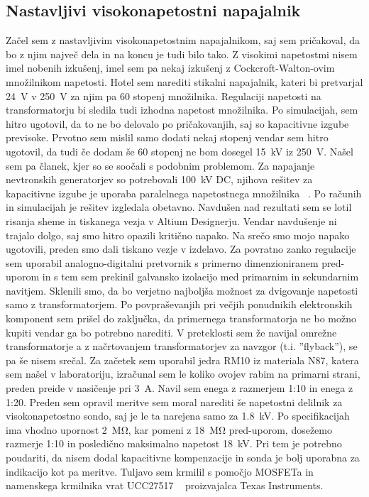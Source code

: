 \documentclass[a4paper,twoside,openright,12pt,Slovene]{book}
\begin{document}
	\subsection{Nastavljivi visokonapetostni napajalnik}
	Začel sem z nastavljivim visokonapetostnim napajalnikom, saj sem pričakoval, da bo z njim največ dela in na koncu je tudi bilo tako. Z visokimi napetostmi nisem imel nobenih izkušenj, imel sem pa nekaj izkušenj z Cockcroft-Walton-ovim množilnikom napetosti. Hotel sem narediti stikalni napajalnik, kateri bi pretvarjal \SI{24}{\volt} v \SI{250}{\volt} za njim pa 60 stopenj množilnika. Regulaciji napetosti na transformatorju bi sledila tudi izhodna napetost množilnika. Po simulacijah, sem hitro ugotovil, da to ne bo delovalo po pričakovanjih, saj so kapacitivne izgube previsoke. Prvotno sem mislil samo dodati nekaj stopenj vendar sem hitro ugotovil, da tudi če dodam še 60 stopenj ne bom dosegel \SI{15}{\kilo\volt} iz \SI{250}{\volt}. Našel sem pa članek, kjer so se soočali s podobnim problemom. Za napajanje nevtronskih generatorjev so potrebovali \SI{100}{\kilo\volt} DC, njihova rešitev za kapacitivne izgube je uporaba paralelnega napetostnega množilnika  ~\cite{ParallelHighVoltageMultipliers}. Po računih in simulacijah je rešitev izgledala obetavno. Navdušen nad rezultati sem se lotil risanja sheme in tiskanega vezja v Altium Designerju. Vendar navdušenje ni trajalo dolgo, saj smo hitro opazili kritično napako. Na srečo smo mojo napako ugotovili, preden smo dali tiskano vezje v izdelavo. Za povratno zanko regulacije sem uporabil analogno-digitalni pretvornik s primerno dimenzioniranem pred-uporom in s tem sem prekinil galvansko izolacijo med primarnim in sekundarnim navitjem. Sklenili smo, da bo verjetno najboljša možnost za dvigovanje napetosti samo z transformatorjem. Po povpraševanjih pri večjih ponudnikih elektronskih komponent sem prišel do zaključka, da primernega transformatorja ne bo možno kupiti vendar ga bo potrebno narediti. V preteklosti sem že navijal omrežne transformatorje a z načrtovanjem transformatorjev za navzgor (t.i. ''flyback''), se pa še nisem srečal. Za začetek sem uporabil jedra RM10 iz materiala N87, katera sem našel v laboratoriju, izračunal sem le koliko ovojev rabim na primarni strani, preden preide v nasičenje pri \SI{3}{\ampere}. Navil sem enega z razmerjem 1:10 in enega z 1:20.
Preden sem opravil meritve sem moral narediti še napetostni delilnik za visokonapetostno sondo, saj je le ta narejena samo za \SI{1.8}{\kilo\volt}. Po specifikacijah ima vhodno upornost \SI{2}{\mega\ohm}, kar pomeni z \SI{18}{\mega\ohm} pred-uporom, dosežemo razmerje 1:10 in posledično maksimalno napetost \SI{18}{\kilo\volt}. Pri tem je potrebno poudariti, da nisem dodal kapacitivne kompenzacije in sonda je bolj uporabna za indikacijo kot pa meritve. Tuljavo sem krmilil s pomočjo MOSFETa in namenskega krmilnika vrat UCC27517 ~\cite{TI:UCC28740} proizvajalca Texas Instruments. 
\end{document}

